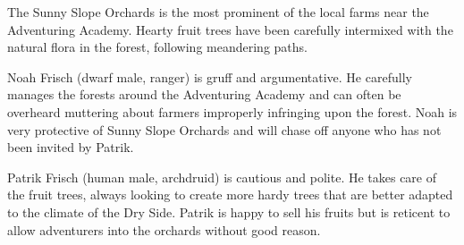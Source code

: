 The Sunny Slope Orchards is the most prominent of the local farms near the Adventuring Academy.
Hearty fruit trees have been carefully intermixed with the natural flora in the forest, following meandering paths.

Noah Frisch (dwarf male, ranger) is gruff and argumentative.
He carefully manages the forests around the Adventuring Academy and can often be overheard muttering about farmers improperly infringing upon the forest.
Noah is very protective of Sunny Slope Orchards and will chase off anyone who has not been invited by Patrik.

Patrik Frisch (human male, archdruid) is cautious and polite.
He takes care of the fruit trees, always looking to create more hardy trees that are better adapted to the climate of the Dry Side.
Patrik is happy to sell his fruits but is reticent to allow adventurers into the orchards without good reason.
